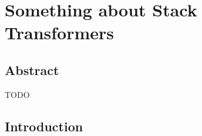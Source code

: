 \chapter{Something about Stack Transformers} \label{chap:chap-5}


\section{Abstract}
TODO
\section{Introduction}

